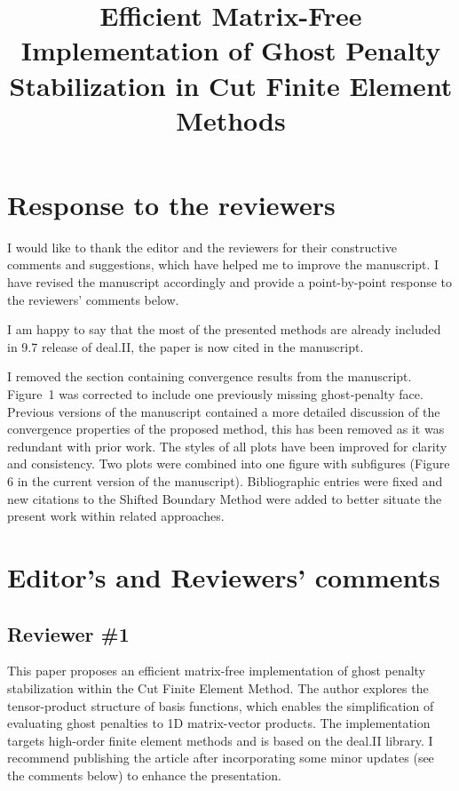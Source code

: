 \documentclass[11pt, a4paper]{article}
\newcommand{\reviewer}[1]{\subsection*{#1}}
\begin{document}
\title{Efficient Matrix-Free Implementation of Ghost Penalty Stabilization in Cut Finite Element Methods}

\section*{Response to the reviewers}
I would like to thank the editor and the reviewers for their constructive comments and suggestions, which have helped
me to improve the manuscript. I have revised the manuscript accordingly and provide a point-by-point response to the
reviewers' comments below.

I am happy to say that the most of the presented methods  are already included in 9.7 release of deal.II, the paper is
now cited in the manuscript.

I removed the section containing convergence results from the manuscript. Figure~1 was corrected to include one
previously missing ghost‑penalty face.
Previous versions of the manuscript contained a more detailed discussion of the convergence properties of the proposed
method, this has been removed as it was redundant with prior work.
The styles of all plots have been improved for clarity and consistency.
Two plots were combined into one figure with subfigures (Figure 6 in the current version of the manuscript).
Bibliographic entries were fixed and new citations to the Shifted Boundary Method were added to better situate the
present work within related approaches.

\section*{Editor's and Reviewers' comments}

\reviewer{Reviewer \#1}

This paper proposes an efficient matrix-free implementation of ghost penalty stabilization within the Cut Finite
Element Method. The author explores the tensor-product structure of basis functions, which enables the simplification
of evaluating ghost penalties to 1D matrix-vector products. The implementation targets high-order finite element
methods and is based on the deal.II library. I recommend publishing the article after incorporating some minor updates
(see the comments below) to enhance the presentation.
\end{document}
